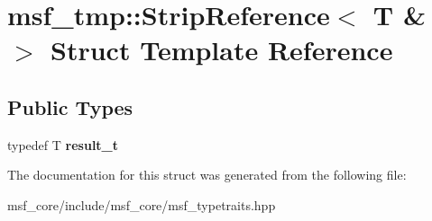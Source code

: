 \hypertarget{structmsf__tmp_1_1StripReference_3_01T_01_6_01_4}{\section{msf\-\_\-tmp\-:\-:Strip\-Reference$<$ T \& $>$ Struct Template Reference}
\label{structmsf__tmp_1_1StripReference_3_01T_01_6_01_4}
}
\subsection*{Public Types}
\begin{DoxyCompactItemize}
\item 
\hypertarget{structmsf__tmp_1_1StripReference_3_01T_01_6_01_4_a3c52c9c3462d4be0736e5820c2121b68}{typedef T {\bfseries result\-\_\-t}}\label{structmsf__tmp_1_1StripReference_3_01T_01_6_01_4_a3c52c9c3462d4be0736e5820c2121b68}

\end{DoxyCompactItemize}


The documentation for this struct was generated from the following file\-:\begin{DoxyCompactItemize}
\item 
msf\-\_\-core/include/msf\-\_\-core/msf\-\_\-typetraits.\-hpp\end{DoxyCompactItemize}

